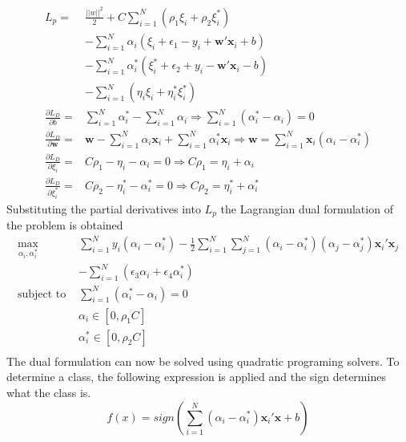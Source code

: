 \documentclass[twoside,11pt]{article}
\begin{document}
\[
\begin{array}{cc}
L_p=&\frac{||w||^2}{2}+C\displaystyle\sum_{i=1}^N(\rho_1\xi_i + \rho_2\xi_i^*) \\
& - \displaystyle\sum_{i=1}^N \alpha_i(\xi_i + \epsilon_1 - y_i + \mathbf{w}'\mathbf{x}_i + b)\\
& - \displaystyle\sum_{i=1}^N \alpha_i^*(\xi_i^* + \epsilon_2 + y_i - \mathbf{w}'\mathbf{x}_i - b)\\
&-\displaystyle\sum_{i=1}^N (\eta_i \xi_i + \eta_i^* \xi_i^*)\\
\frac{\partial L_D}{\partial b} = &\displaystyle\sum_{i=1}^N \alpha_i^*  - \displaystyle\sum_{i=1}^N \alpha_i \Rightarrow \displaystyle\sum_{i=1}^N (\alpha_i^* - \alpha_i) = 0 \\
\frac{\partial L_D}{\partial \mathbf{w}} = & \mathbf{w}-\displaystyle\sum_{i=1}^N \alpha_i \mathbf{x}_i+\displaystyle\sum_{i=1}^N \alpha_i^* \mathbf{x}_i \Rightarrow \mathbf{w} = \displaystyle\sum_{i=1}^N \mathbf{x}_i (\alpha_i - \alpha_i^*)\\
\frac{\partial L_D}{\partial \xi_i} = & C\rho_1 - \eta_i -\alpha_i = 0 \Rightarrow  C\rho_1 = \eta_i + \alpha_i \\
\frac{\partial L_D}{\partial \xi_i^*} = &C\rho_2 - \eta_i^* -\alpha_i^* = 0 \Rightarrow  C\rho_2 = \eta_i^* + \alpha_i^*
\end{array}
\]
Substituting the partial derivatives into $L_p$ the Lagrangian dual formulation of the problem is obtained
\begin{equation} \label{Eq:QuantileSVMduala}
\begin{array}{cc}
\displaystyle\max_{\alpha_i, \alpha_i^*}& \displaystyle\sum_{i=1}^N y_i(\alpha_i - \alpha_i^*) - \frac{1}{2} \displaystyle\sum_{i=1}^N\displaystyle\sum_{j=1}^N (\alpha_i - \alpha_i^*)(\alpha_j - \alpha_j^*)\mathbf{x}_i' \mathbf{x}_j \\
&-\displaystyle\sum_{i=1}^N (\epsilon_3\alpha_i + \epsilon_4\alpha_i^*) \\
\text{subject to    } & \displaystyle\sum_{i=1}^N(\alpha_i^* - \alpha_i)=0 \\
& \alpha_i \in [0,\rho_1C] \\
& \alpha_i^* \in [0,\rho_2C] \\
\end{array}
\end{equation}
The dual formulation can now be solved using quadratic programing solvers. To determine a class, the following expression is applied and the sign determines what the class is.
\begin{equation}\label{finalpredictioneqn1}
f(x)=sign(\displaystyle\sum_{i=1}^N (\alpha_i - \alpha_i^*)\mathbf{x}_i'\mathbf{x} +b)
\end{equation}
\end{document}

